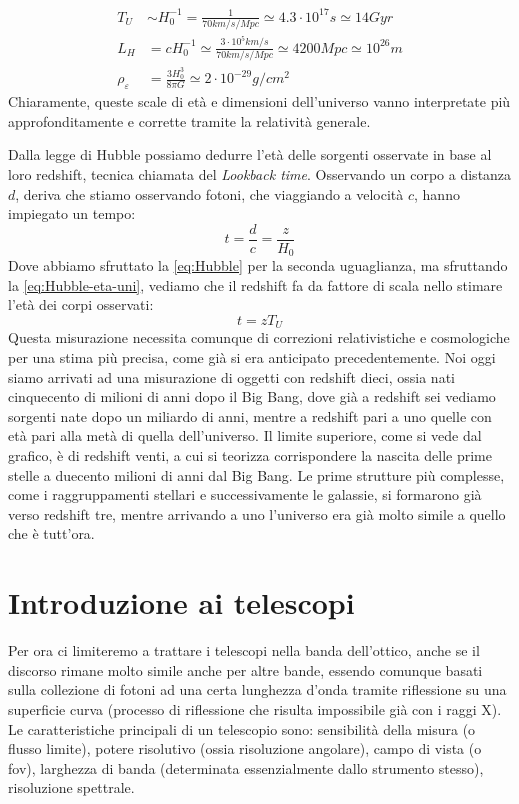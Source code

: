 \documentclass[a4paper,twoside,openany,notitlepage]{book}
\newcommand{\e}[1]{\cdot 10^{#1}}
\theoremstyle{definition}
\theoremstyle{plain}
\begin{document}
\begin{align}
	\label{eq:Hubble-eta-uni}
	T_U   & \sim H_0^{-1} = \frac{1}{70km/s/Mpc} \simeq 4.3\e{17}s \simeq 14Gyr \\
	\label{eq:Hubble-grand-uni}
	L_H   & = cH_0^{-1} \simeq \frac{3\e{5}km/s}{70km/s/Mpc} \simeq 4200Mpc \simeq 10^{26}m \\
	\label{eq:Hubble-dens-uni}
	\rho_\varepsilon   & = \frac{3H_0^3}{8\pi G} \simeq 2\e{-29}g/cm^2
\end{align}
Chiaramente, queste scale di età e dimensioni dell'universo vanno interpretate più approfonditamente e corrette tramite la relatività generale.

Dalla legge di Hubble possiamo dedurre l'età delle sorgenti osservate in base al loro redshift, tecnica chiamata del \textit{Lookback time}. Osservando un corpo a distanza $d$, deriva che stiamo osservando fotoni, che viaggiando a velocità $c$, hanno impiegato un tempo:
\begin{equation*}
	t=\frac{d}{c}=\frac{z}{H_0}
\end{equation*}
Dove abbiamo sfruttato la \ref{eq:Hubble} per la seconda uguaglianza, ma sfruttando la \ref{eq:Hubble-eta-uni}, vediamo che il redshift fa da fattore di scala nello stimare l'età dei corpi osservati:
\begin{equation*}
	t=zT_U
\end{equation*}
Questa misurazione necessita comunque di correzioni relativistiche e cosmologiche per una stima più precisa, come già si era anticipato precedentemente. Noi oggi siamo arrivati ad una misurazione di oggetti con redshift dieci, ossia nati cinquecento di milioni di anni dopo il Big Bang, dove già a redshift sei vediamo sorgenti nate dopo un miliardo di anni, mentre a redshift pari a uno quelle con età pari alla metà di quella dell'universo. Il limite superiore, come si vede dal grafico, è di redshift venti, a cui si teorizza corrispondere la nascita delle prime stelle a duecento milioni di anni dal Big Bang. Le prime strutture più complesse, come i raggruppamenti stellari e successivamente le galassie, si formarono già verso redshift tre, mentre arrivando a uno l'universo era già molto simile a quello che è tutt'ora.

\chapter{Introduzione ai telescopi}

Per ora ci limiteremo a trattare i telescopi nella banda dell'ottico, anche se il discorso rimane molto simile anche per altre bande, essendo comunque basati sulla collezione di fotoni ad una certa lunghezza d'onda tramite riflessione su una superficie curva (processo di riflessione che risulta impossibile già con i raggi X). Le caratteristiche principali di un telescopio sono: sensibilità della misura (o flusso limite), potere risolutivo (ossia risoluzione angolare), campo di vista (o fov), larghezza di banda (determinata essenzialmente dallo strumento stesso), risoluzione spettrale.
\end{document}
